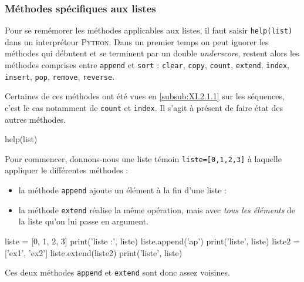 \subsubsection[Méthodes spécifiques aux listes]{Méthodes spécifiques aux listes}
\label{subsub:XI.2.2.2}

Pour se remémorer les méthodes applicables aux listes, il faut saisir \texttt{help(list)} dans un interpréteur \textsc{Python}. Dans un premier temps on peut ignorer les méthodes qui débutent et se terminent par un double \textit{underscore}, restent alors les méthodes comprises entre \texttt{append} et \texttt{sort} : \texttt{clear}, \texttt{copy}, \texttt{count}, \texttt{extend}, \texttt{index}, \texttt{insert}, \texttt{pop}, \texttt{remove}, \texttt{reverse}. 

Certaines de ces méthodes ont été vues en \cref{subsub:XI.2.1.1} sur les séquences, c'est le cas notamment de \texttt{count} et \texttt{index}. Il s'agit à présent de faire état des autres méthodes.


\begin{idleconsole*}
\begin{pyconsole}[][breaklines]
help(list)
\end{pyconsole}
\end{idleconsole*}

Pour commencer, donnons-nous une liste témoin \texttt{liste=[0,1,2,3]} à laquelle appliquer le différentes méthodes :
\vspace{-1pt}%
\begin{itemize}
\item la méthode \texttt{append} ajoute un élément à la fin d'une liste :
\item la méthode \texttt{extend} réalise la même opération, mais avec \emph{tous les éléments} de la liste qu'on lui passe en argument.
\end{itemize}

\begin{idleconsole}
\begin{pyconsole}
liste = [0, 1, 2, 3]
print('liste :', liste)
liste.append('ap')
print('liste', liste)
liste2 = ['ex1', 'ex2']
liste.extend(liste2)
print('liste', liste)
\end{pyconsole}
\end{idleconsole}

Ces deux méthodes \texttt{append} et \texttt{extend} sont donc assez voisines. 


